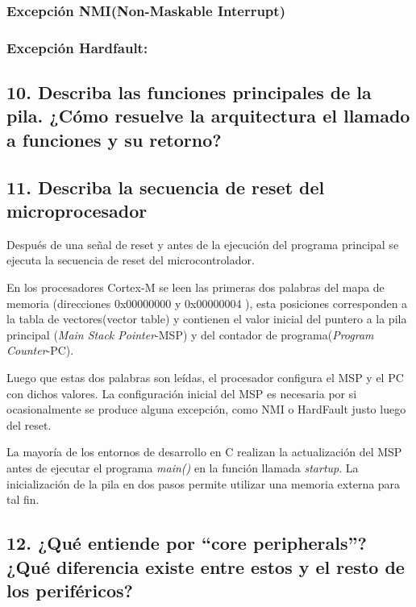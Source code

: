 \documentclass[10pt,a4paper,twoside,spanish]{article}	%
\begin{document}
\subsubsection*{Excepción NMI(Non-Maskable Interrupt)} 


\subsubsection*{Excepción Hardfault:}


\subsection*{10. Describa las funciones principales de la pila. ¿Cómo resuelve la arquitectura el llamado a funciones y su retorno?}

\subsection*{11. Describa la secuencia de reset del microprocesador}

Después de una señal de reset y antes de la ejecución del programa principal se ejecuta la secuencia de reset del microcontrolador.
 
En los procesadores Cortex-M se leen las primeras dos palabras del mapa de memoria (direcciones 0x00000000 y 0x00000004 ), esta posiciones corresponden a la tabla de vectores(vector table) y contienen el valor inicial del puntero a la pila principal (\textit{Main Stack Pointer}-MSP) y del contador de programa(\textit{Program Counter}-PC).

Luego que estas dos palabras son leídas, el procesador configura el MSP y el PC con dichos valores. La configuración inicial del MSP es necesaria por si ocasionalmente se produce alguna excepción, como NMI o HardFault justo luego del reset.

La mayoría de los entornos de desarrollo en C realizan la actualización del MSP antes de ejecutar el programa \textit{main()} en la función llamada \textit{startup}. La inicialización de la pila en dos pasos permite utilizar una memoria externa para tal fin. 



\subsection*{12. ¿Qué entiende por “core peripherals”? ¿Qué diferencia existe entre estos y el resto de los periféricos?}
\end{document}
